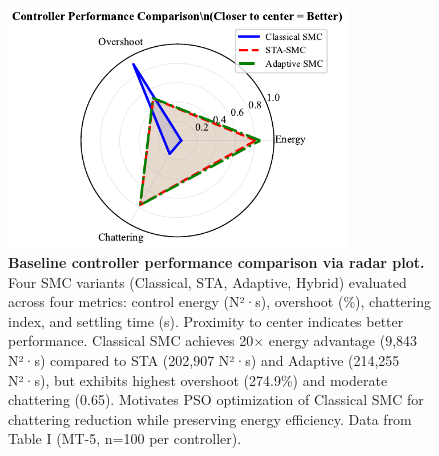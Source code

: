 %
%

\begin{figure}[htbp]
\centering
\includegraphics[width=0.8\textwidth]{figures/fig3_baseline_radar.pdf}
\caption{%
\textbf{Baseline controller performance comparison via radar plot.}
Four SMC variants (Classical, STA, Adaptive, Hybrid) evaluated across four metrics:
control energy (N²·s), overshoot (\%), chattering index, and settling time (s).
Proximity to center indicates better performance. Classical SMC achieves 20$\times$ energy
advantage (9,843 N²·s) compared to STA (202,907 N²·s) and Adaptive (214,255 N²·s),
but exhibits highest overshoot (274.9\%) and moderate chattering (0.65).
Motivates PSO optimization of Classical SMC for chattering reduction while preserving
energy efficiency. Data from Table I (MT-5, n=100 per controller).
}
\label{fig:baseline-radar}
\end{figure}


